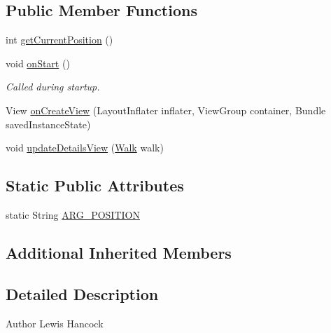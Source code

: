 \subsection*{Public Member Functions}
\begin{DoxyCompactItemize}
\item 
int \hyperlink{classuk_1_1ac_1_1swan_1_1digitaltrails_1_1fragments_1_1_search_details_fragment_a7f81c253227eb5a8623fd1e5698d572b}{get\+Current\+Position} ()
\item 
void \hyperlink{classuk_1_1ac_1_1swan_1_1digitaltrails_1_1fragments_1_1_search_details_fragment_aac5c7e87af3303c241d5a8d45eafcc43}{on\+Start} ()
\begin{DoxyCompactList}\small\item\em Called during startup. \end{DoxyCompactList}\item 
View \hyperlink{classuk_1_1ac_1_1swan_1_1digitaltrails_1_1fragments_1_1_search_details_fragment_af50a3e34ab40b874152851e40df2996b}{on\+Create\+View} (Layout\+Inflater inflater, View\+Group container, Bundle saved\+Instance\+State)
\item 
void \hyperlink{classuk_1_1ac_1_1swan_1_1digitaltrails_1_1fragments_1_1_search_details_fragment_a30a52dee58e0523db1319bd1b5dfdc77}{update\+Details\+View} (\hyperlink{classuk_1_1ac_1_1swan_1_1digitaltrails_1_1components_1_1_walk}{Walk} walk)
\end{DoxyCompactItemize}
\subsection*{Static Public Attributes}
\begin{DoxyCompactItemize}
\item 
static String \hyperlink{classuk_1_1ac_1_1swan_1_1digitaltrails_1_1fragments_1_1_search_details_fragment_aad25040ec92e3ffc5c69918cfa23a20b}{A\+R\+G\+\_\+\+P\+O\+S\+I\+T\+I\+O\+N}
\end{DoxyCompactItemize}
\subsection*{Additional Inherited Members}


\subsection{Detailed Description}
\begin{DoxyAuthor}{Author}
Lewis Hancock 
\end{DoxyAuthor}


